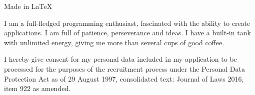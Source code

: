 \documentclass[a4paper]{article}
\begin{document}
    
    \noindent\hspace{10.2cm} Made in LaTeX
    
    I am a full-fledged programming enthusiast, fascinated with the ability to create applications. I am full of patience, perseverance and ideas. I have a built-in tank with unlimited energy, giving me more than several cups of good coffee.%
    
    \noindent\makebox[\linewidth]{\rule{\paperwidth}{0.4pt}}
        
    \leftPanel
        
    \rightPanel
    I hereby give consent for my personal data included in my application to be processed for the purposes of the recruitment process under the Personal Data Protection Act as of 29 August 1997, consolidated text: Journal of Laws 2016, item 922 as amended.%
\end{document}
